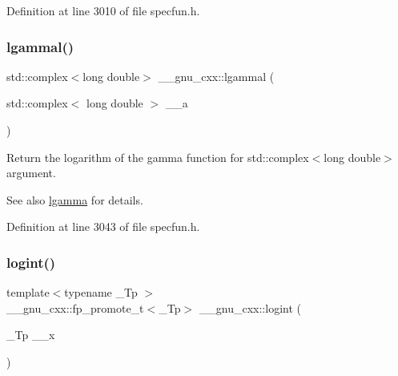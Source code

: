 Definition at line 3010 of file specfun.\+h.

\mbox{\label{group__mathsf__gnu_ga5f12f60afe9a47f4ca04964f642bbf0d}} 
\subsubsection{\texorpdfstring{lgammal()}{lgammal()}\hspace{0.1cm}{\footnotesize\ttfamily [2/2]}}
{\footnotesize\ttfamily std\+::complex$<$long double$>$ \+\_\+\+\_\+gnu\+\_\+cxx\+::lgammal (\begin{DoxyParamCaption}\item[{std\+::complex$<$ long double $>$}]{\+\_\+\+\_\+a }\end{DoxyParamCaption})\hspace{0.3cm}{\ttfamily [inline]}}

Return the logarithm of the gamma function for {\ttfamily  std\+::complex$<$long double$>$ } argument.

\begin{DoxySeeAlso}{See also}
\hyperlink{group__mathsf__gnu_ga40fa5127f7c419ed1d8f1c6a6f96ea9b}{lgamma} for details. 
\end{DoxySeeAlso}


Definition at line 3043 of file specfun.\+h.

\mbox{\label{group__mathsf__gnu_ga1c0fe0f4cb72041f24db82dc7e47df11}} 
\subsubsection{\texorpdfstring{logint()}{logint()}}
{\footnotesize\ttfamily template$<$typename \+\_\+\+Tp $>$ \\
\+\_\+\+\_\+gnu\+\_\+cxx\+::fp\+\_\+promote\+\_\+t$<$\+\_\+\+Tp$>$ \+\_\+\+\_\+gnu\+\_\+cxx\+::logint (\begin{DoxyParamCaption}\item[{\+\_\+\+Tp}]{\+\_\+\+\_\+x }\end{DoxyParamCaption})\hspace{0.3cm}{\ttfamily [inline]}}

